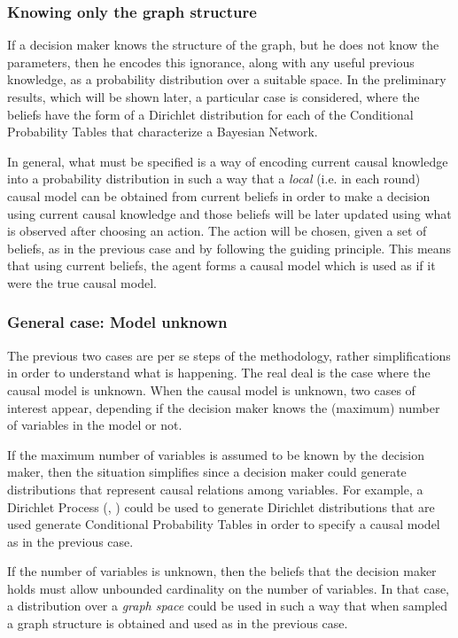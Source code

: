 \documentclass[english,letterpaper,12pt,final]{article}
\theoremstyle{definition}
\begin{document}
\subsubsection{Knowing only the graph structure}
If a decision maker knows the structure of the graph, but he does not know the parameters, then he encodes this ignorance, along with any useful previous knowledge, as a probability distribution over a suitable space. In the preliminary results, which will be shown later, a particular case is considered, where the beliefs have the form of a Dirichlet distribution for each of the Conditional Probability Tables that characterize a Bayesian Network.

In general, what must be specified is a way of encoding current causal knowledge into a probability distribution in such a way that a \textit{local} (i.e. in each round) causal model can be obtained from current beliefs in order to make a decision using current causal knowledge and those beliefs will be later updated using what is observed after choosing an action.  The action will be chosen, given a set of beliefs, as in the previous case and by following the guiding principle. This means that using current beliefs, the agent forms a causal model which is used as if it were the true causal model.
\subsubsection{General case: Model unknown}
The previous two cases are per se steps of the methodology, rather simplifications in order to understand what is happening. The real deal is the case where the causal model is unknown. When the causal model is unknown, two cases of interest appear, depending if the decision maker knows the (maximum) number of variables in the model or not. 

If the maximum number of variables is assumed to be known by the decision maker, then the situation simplifies since a decision maker could generate distributions that represent causal relations among variables. For example, a Dirichlet Process (\cite{ferguson1973bayesian}, \cite{ghosal2017fundamentals}) could be used to generate Dirichlet distributions that are used generate Conditional Probability Tables in order to specify a causal model as in the previous case.

If the number of variables is unknown, then the beliefs that the decision maker holds must allow unbounded cardinality on the number of variables. In that case, a distribution over a \textit{graph space} could be used in such a way that when sampled a graph structure is obtained and used as in the previous case.  
\end{document}
